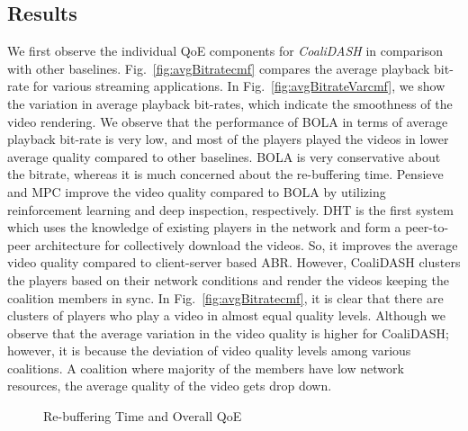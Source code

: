 \subsection{Results}
We first observe the individual QoE components for \textit{CoaliDASH} in comparison with other baselines. Fig.~\ref{fig:avgBitratecmf} compares the average playback bit-rate for various streaming applications. In Fig.~\ref{fig:avgBitrateVarcmf}, we show the variation in average playback bit-rates, which indicate the smoothness of the video rendering. We observe that the performance of BOLA in terms of average playback bit-rate is very low, and most of the players played the videos in lower average quality compared to other baselines. BOLA is very conservative about the bitrate, whereas it is much concerned about the re-buffering time. Pensieve and MPC improve the video quality compared to BOLA by utilizing reinforcement learning and deep inspection, respectively. DHT is the first system which uses the knowledge of existing players in the network and form a peer-to-peer architecture for collectively download the videos. So, it improves the average video quality compared to client-server based ABR. However, CoaliDASH clusters the players based on their network conditions and render the videos keeping the coalition members in sync. In Fig.~\ref{fig:avgBitratecmf}, it is clear that there are clusters of players who play a video in almost equal quality levels. Although we observe that the average variation in the video quality is higher for CoaliDASH; however, it is because the deviation of video quality levels among various coalitions. A coalition where majority of the members have low network resources, the average quality of the video gets drop down. 

\begin{figure}[!ht]
	\captionsetup[subfigure]{}
	\begin{center}
	\end{center}
	\caption{\label{fig:avgBitrateVar} Re-buffering Time and Overall QoE}
\end{figure}

